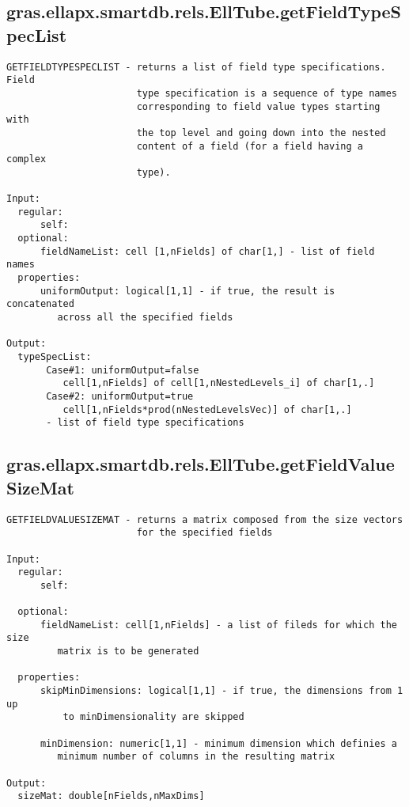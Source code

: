 \subsection{\texorpdfstring{gras.ellapx.smartdb.rels.EllTube.getFieldTypeSpecList}{getFieldTypeSpecList}}\label{method:gras.ellapx.smartdb.rels.EllTube.getFieldTypeSpecList}
\begin{verbatim}
GETFIELDTYPESPECLIST - returns a list of field type specifications. Field
                       type specification is a sequence of type names
                       corresponding to field value types starting with
                       the top level and going down into the nested
                       content of a field (for a field having a complex
                       type).

Input:
  regular:
      self:
  optional:
      fieldNameList: cell [1,nFields] of char[1,] - list of field names
  properties:
      uniformOutput: logical[1,1] - if true, the result is concatenated
         across all the specified fields

Output:
  typeSpecList:
       Case#1: uniformOutput=false
          cell[1,nFields] of cell[1,nNestedLevels_i] of char[1,.]
       Case#2: uniformOutput=true
          cell[1,nFields*prod(nNestedLevelsVec)] of char[1,.]
       - list of field type specifications
\end{verbatim}
\subsection{\texorpdfstring{gras.ellapx.smartdb.rels.EllTube.getFieldValueSizeMat}{getFieldValueSizeMat}}\label{method:gras.ellapx.smartdb.rels.EllTube.getFieldValueSizeMat}
\begin{verbatim}
GETFIELDVALUESIZEMAT - returns a matrix composed from the size vectors
                       for the specified fields

Input:
  regular:
      self:

  optional:
      fieldNameList: cell[1,nFields] - a list of fileds for which the size
         matrix is to be generated

  properties:
      skipMinDimensions: logical[1,1] - if true, the dimensions from 1 up
          to minDimensionality are skipped

      minDimension: numeric[1,1] - minimum dimension which definies a
         minimum number of columns in the resulting matrix

Output:
  sizeMat: double[nFields,nMaxDims]
\end{verbatim}
